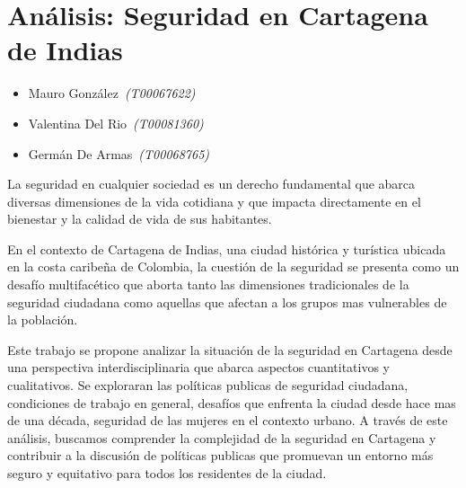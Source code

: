 \documentclass[letterpaper, 12pt]{article}
\begin{document}
\section*{Análisis: Seguridad en Cartagena de Indias}

\noindent\makebox[\linewidth]{\rule{\textwidth}{0.4pt}}

\begin{itemize}[label=$\diamond$]
    \item Mauro González~\textit{(T00067622)}
    \item Valentina Del Rio~\textit{(T00081360)}
    \item Germán De Armas~\textit{(T00068765)}
\end{itemize}

\noindent\makebox[\linewidth]{\rule{\textwidth}{0.4pt}}

\nocite{fontalvo_leyes2019}


\nocite{Comunicaciones_2023}
\nocite{Observatorio_2023}
\nocite{MedicinaLegalCienciasForenses_2023}



% 

La seguridad en cualquier sociedad es un derecho
fundamental que abarca diversas dimensiones de la vida
cotidiana y que impacta directamente en el bienestar y la
calidad de vida de sus habitantes.

En el contexto de Cartagena de Indias, una ciudad histórica
y turística ubicada en la costa caribeña de Colombia, la
cuestión de la seguridad se presenta como un desafío
multifacético que aborta tanto las dimensiones
tradicionales de la seguridad ciudadana como aquellas que
afectan a los grupos mas vulnerables de la población.

Este trabajo se propone analizar la situación de la
seguridad en Cartagena desde una perspectiva
interdisciplinaria que abarca aspectos cuantitativos y
cualitativos. Se exploraran las políticas publicas de
seguridad ciudadana, condiciones de trabajo en general,
desafíos que enfrenta la ciudad desde hace mas de una
década, seguridad de las mujeres en el contexto urbano. A
través de este análisis, buscamos comprender la complejidad
de la seguridad en Cartagena y contribuir a la discusión de
políticas publicas que promuevan un entorno más seguro y
equitativo para todos los residentes de la ciudad.
\end{document}
